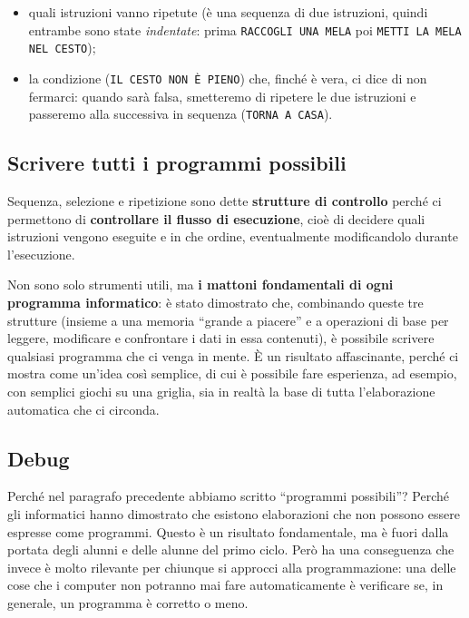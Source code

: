 \begin{itemize}
\item
  quali istruzioni vanno ripetute (è una sequenza di due istruzioni, quindi entrambe sono state \textit{indentate}: prima \texttt{RACCOGLI UNA MELA} poi \texttt{METTI LA MELA NEL CESTO});
\item
  la condizione (\texttt{IL CESTO NON È PIENO}) che, finché è vera, ci dice di non fermarci: quando sarà falsa, smetteremo di ripetere le due istruzioni e passeremo alla successiva in sequenza (\texttt{TORNA A CASA}).
\end{itemize}

\subsection{Scrivere tutti i programmi possibili }\label{scrivere-tutti-i-programmi-possibili}

Sequenza, selezione e ripetizione sono dette \textbf{strutture di controllo} perché ci permettono di \textbf{controllare il flusso di esecuzione}, cioè di decidere quali istruzioni vengono eseguite e in che ordine, eventualmente modificandolo durante l'esecuzione.

Non sono solo strumenti utili, ma \textbf{i mattoni fondamentali di ogni programma informatico}: è stato dimostrato che, combinando queste tre strutture (insieme a una memoria ``grande a piacere'' e a operazioni di base per leggere, modificare e confrontare i dati in essa contenuti), è possibile scrivere qualsiasi programma che ci venga in mente. È un risultato affascinante, perché ci mostra come un'idea così semplice, di cui è possibile fare esperienza, ad esempio, con semplici giochi su una griglia, sia in realtà la base di tutta l'elaborazione automatica che ci circonda.

\subsection{Debug }\label{debug}

Perché nel paragrafo precedente abbiamo scritto ``programmi possibili''? Perché gli informatici hanno dimostrato che esistono elaborazioni che non possono essere espresse come programmi. Questo è un risultato fondamentale, ma è fuori dalla portata degli alunni e delle alunne del primo ciclo. Però ha una conseguenza che invece è molto rilevante per chiunque si approcci alla programmazione: una delle cose che i computer non potranno mai fare automaticamente è verificare se, in generale, un programma è corretto o meno.

